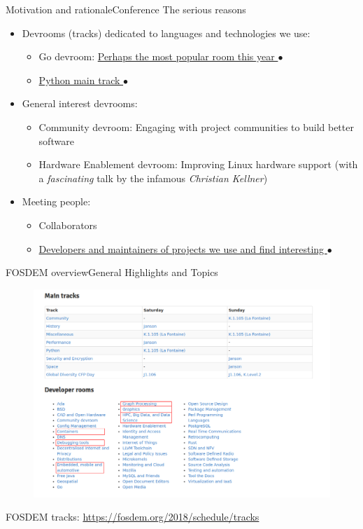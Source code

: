 \documentclass[10pt]{beamer}
\begin{document}
\begin{frame}{Motivation and rationale}{Conference}
    The serious reasons
    \begin{itemize}
        \item Devrooms (tracks) dedicated to languages and technologies we use:
            \begin{itemize}
                \item Go devroom: \href{./photos/go-devroom-queue.jpg}{Perhaps the most popular room this year $\bullet$}
                \item \href{./photos/python-talk.jpg}{Python main track $\bullet$}
            \end{itemize}
        \item General interest devrooms:
            \begin{itemize}
                \item Community devroom: Engaging with project communities to build better software
                \item Hardware Enablement devroom: Improving Linux hardware support (with a \emph{fascinating} talk by the infamous \emph{Christian Kellner})
            \end{itemize}
        \item Meeting people:
            \begin{itemize}
                \item Collaborators
                \item \href{./photos/collab.jpg}{Developers and maintainers of projects we use and find interesting $\bullet$}
            \end{itemize}
    \end{itemize}
\end{frame}

\begin{frame}{FOSDEM overview}{General Highlights and Topics}
    \begin{figure}
        \includegraphics[width=\textwidth]{tracks-devrooms.png}
    \end{figure}

    FOSDEM tracks: \url{https://fosdem.org/2018/schedule/tracks}
\end{frame}
\end{document}
